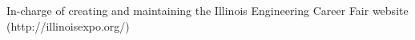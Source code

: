 \begin{cvitemize}
\item  
\item In-charge of creating and maintaining the Illinois Engineering Career Fair website (http://illinoisexpo.org/)
\item 
\end{cvitemize}